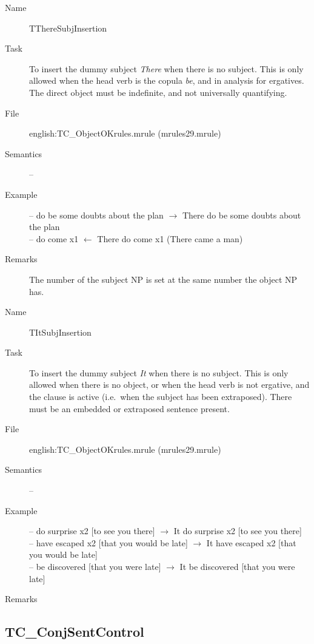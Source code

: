 \begin{description}
\vspace{1 cm}
\begin{description}
\item[Name] TThereSubjInsertion
\item[Task] To insert the dummy subject {\em There\/} when there is no subject.
This is only allowed when the head verb is the copula {\em be\/}, and in 
analysis for ergatives. The direct object must be indefinite, and not 
universally quantifying.
\item[File] english:TC\_ObjectOKrules.mrule (mrules29.mrule)
\item[Semantics] --
\item[Example] \mbox{}
-- do be some doubts about the plan $\rightarrow$ There do be some doubts about 
the plan\\
-- do come x1 $\leftarrow$ There do come x1 (There came a man)
\item[Remarks] The number of the subject NP is set at the same number the object 
NP has.
\end{description}

\vspace{1 cm}
\begin{description}
\item[Name]   TItSubjInsertion
\item[Task] To insert the dummy subject {\em It\/} when there is no subject.
This is only allowed when there is no object, or when the head verb is not 
ergative, and the clause is active (i.e.\ when the subject has been extraposed).
There must be an embedded or extraposed sentence present.
\item[File] english:TC\_ObjectOKrules.mrule (mrules29.mrule)
\item[Semantics] --
\item[Example] \mbox{}
-- do surprise x2 [to see you there] $\rightarrow$ It do surprise x2 [to see 
you there]\\
-- have escaped x2 [that you would be late] $\rightarrow$ It have escaped x2 
[that you would be late]\\
-- be discovered [that you were late] $\rightarrow$ It be discovered [that you 
were late]
\item[Remarks] 
\end{description}

\end{description}

\newpage
\subsection{TC\_ConjSentControl}

